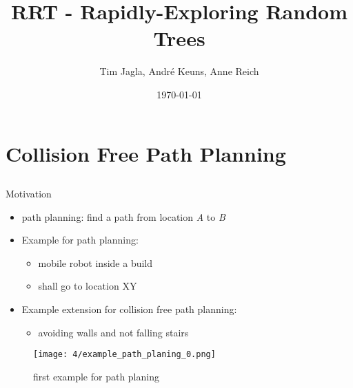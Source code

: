 \documentclass[%
  professionalfonts,%
  xcolor={%
    usenames,%
    dvipsnames,%
    svgnames,%
    table,%
    hyperref%
  }%
]{beamer}
\title{RRT - Rapidly-Exploring Random Trees}
\author{Tim Jagla, André Keuns, Anne Reich}
\institute[FIN]{Otto-von-Guericke-Universität Magdeburg}
\date{\today}
\begin{document}
  \begin{frame}
    \titlepage
  \end{frame}
  
  \section{Collision Free Path Planning}
    \begin{frame}
      \huge{}
    \end{frame}
    
    \subsection*{}
      \begin{frame}{Motivation}
        \begin{itemize}
          \item path planning: find a path from location \emph{A} to \emph{B}
          \item Example for path planning:
          \begin{itemize}
            \item mobile robot inside a build
            \item shall go to location XY
          \end{itemize}
          \item Example extension for collision free path planning:
          \begin{itemize}
            \item avoiding walls and not falling stairs
          \end{itemize}
        \end{itemize}
        
        \begin{figure}[h]
          \texttt{[image: 4/example\_path\_planing\_0.png]}
          \caption{first example for path planing}
          \label{fig:example path planing 0}
        \end{figure}
      \end{frame}
    
\end{document}
